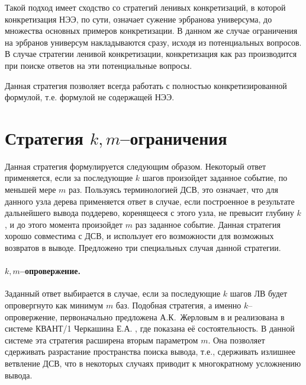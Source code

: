 Такой подход имеет сходство со стратегий ленивых конкретизаций, в которой конкретизация НЭЭ, по сути, означает сужение эрбранова универсума, до множества основных примеров конкретизации. В данном же случае ограничения на эрбранов универсум накладываются сразу, исходя из потенциальных вопросов. В случае стратегии ленивой конкретизации, конкретизация как раз производится при поиске ответов на эти потенциальные вопросы.

Данная стратегия позволяет всегда работать с полностью конкретизированной формулой, т.е. формулой не содержащей НЭЭ.




\section{Стратегия $k,m$--ограничения}
Данная стратегия формулируется следующим образом. Некоторый ответ применяется, если за последующие $k$ шагов произойдет заданное событие, по меньшей мере $m$ раз. Пользуясь терминологией ДСВ, это означает, что для данного узла дерева применяется ответ в случае, если построенное в результате дальнейшего вывода поддерево, коренящееся с этого узла, не превысит глубину $k$, и до этого момента произойдет $m$ раз заданное событие. Данная стратегия хорошо совместима с ДСВ, и использует его возможности для возможных возвратов в выводе. Предложено три специальных случая данной стратегии.

\paragraph{$k,m$--опровержение.} Заданный ответ выбирается в случае, если за последующие $k$ шагов ЛВ будет опровергнуто как минимум $m$ баз. Подобная стратегия, а именно $k$--опровержение, первоначально предложена А.К.~Жерловым в \cite{ICDS2000} и реализована в системе КВАНТ/1 Черкашина Е.А. \cite{dissChe}, где показана её состоятельность. В данной системе эта стратегия расширена вторым параметром $m$. Она позволяет сдерживать разрастание пространства поиска вывода, т.е., сдерживать излишнее ветвление ДСВ, что в некоторых случаях приводит к многократному усложнению вывода.

